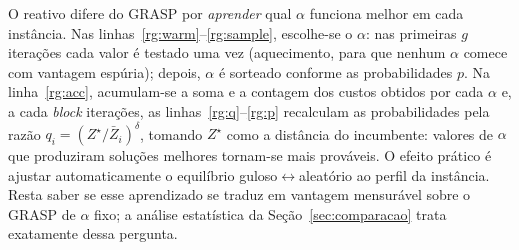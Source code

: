 \documentclass[12pt, a4paper]{article}
\begin{document}
\begin{algorithm}[H]
\caption{\textsc{GRASP-Reativo}}\label{alg:rgrasp}
\begin{algorithmic}[1]
\label{rg:init}
    \label{rg:warm}
  \ELSE
    \label{rg:sample}
  \ENDIF
  \label{rg:build}
  \label{rg:acc}
    \label{rg:improve}
  \ELSE
  \ENDIF
    \label{rg:q}
    \label{rg:p}
  \ENDIF
\ENDWHILE
{}
\end{algorithmic}
\end{algorithm}

 O reativo difere do GRASP por \emph{aprender} qual $\alpha$ funciona melhor em cada instância. Nas linhas~\ref{rg:warm}--\ref{rg:sample}, escolhe-se o $\alpha$: nas primeiras $g$ iterações cada valor é testado uma vez (aquecimento, para que nenhum $\alpha$ comece com vantagem espúria); depois, $\alpha$ é sorteado conforme as probabilidades $p$. Na linha~\ref{rg:acc}, acumulam-se a soma e a contagem dos custos obtidos por cada $\alpha$ e, a cada \textit{block} iterações, as linhas~\ref{rg:q}--\ref{rg:p} recalculam as probabilidades pela razão $q_i=(Z^\star/\bar Z_i)^\delta$, tomando $Z^\star$ como a distância do incumbente: valores de $\alpha$ que produziram soluções melhores tornam-se mais prováveis. O efeito prático é ajustar automaticamente o equilíbrio guloso$\leftrightarrow$aleatório ao perfil da instância. Resta saber se esse aprendizado se traduz em vantagem mensurável sobre o GRASP de $\alpha$ fixo; a análise estatística da Seção~\ref{sec:comparacao} trata exatamente dessa pergunta.
\end{document}
